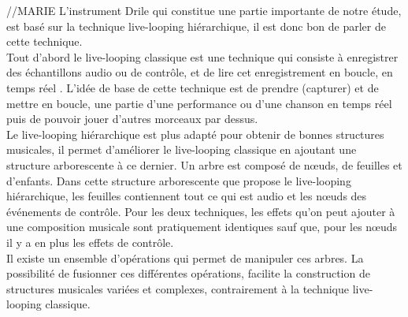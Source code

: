//MARIE
L'instrument Drile qui constitue une partie importante de notre étude, est basé sur la technique live-looping hiérarchique, il est donc bon de parler de cette technique.\\
Tout d'abord le live-looping classique est une technique qui consiste à enregistrer des échantillons audio ou de contrôle, et de lire cet enregistrement en boucle, en temps réel . L'idée de base de cette technique est de prendre (capturer) et de mettre en boucle, une partie d'une performance ou d'une chanson en temps réel puis de pouvoir jouer d'autres morceaux par dessus. \\
Le live-looping hiérarchique est plus adapté pour obtenir de bonnes structures musicales, il permet d'améliorer le live-looping classique en ajoutant une structure arborescente à ce dernier. Un arbre est composé de nœuds, de feuilles et d’enfants. Dans cette structure arborescente que propose le live-looping hiérarchique, les feuilles contiennent tout ce qui est audio et les nœuds des événements de contrôle. Pour les deux techniques, les effets qu'on peut ajouter à une composition musicale sont pratiquement identiques sauf que, pour les nœuds il y a en plus les effets de contrôle.\\
Il existe un ensemble d'opérations qui permet de manipuler ces arbres. La possibilité de fusionner ces différentes opérations, facilite la construction de structures musicales variées et complexes, contrairement à la technique live-looping classique.\\


